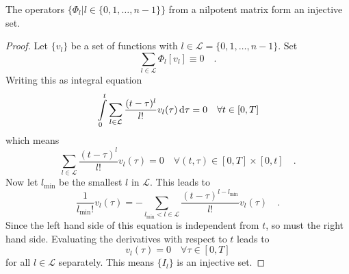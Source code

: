 \begin{proposition}
The operators $\{\Phi_l|l\in\{0,1,\ldots,n-1\}\}$ from a nilpotent matrix form an injective 
set.
\end{proposition}
\begin{proof}
Let $\{v_{l}\}$ be a set of functions with $l\in\mathcal{L}=\{0,1,\ldots,n-1\}$. Set
\begin{equation}
\sum\limits_{l\in\mathcal{L}} \Phi_l[v_l] 
\equiv 0 \quad . 
\end{equation}
Writing this as integral equation
\begin{equation}
\int\limits_0^t \sum\limits_{l\in\mathcal{L}}  
 \frac{(t-\tau)^l}{l!} v_l(\tau) \, \text{d} \tau = 0 \quad \forall t\in[0,T]
\end{equation}
which means
\begin{equation}
 \sum\limits_{l\in\mathcal{L}}  
\frac{(t-\tau)^l}{l!} v_l(\tau) = 0 \quad \forall (t,\tau)
\in [0,T]\times [0,t] \quad .
\end{equation}
Now let $l_\text{min}$ be the smallest $l$ in $\mathcal{L}$. This leads to 
\begin{equation} 
 \frac{1}{l_\text{min}!} v_l(\tau) = - 
\sum\limits_{l_\text{min} <l\in\mathcal{L}}  
\frac{(t-\tau)^{l-l_\text{min}}}{l!}  v_l(\tau) \quad .
\end{equation}
Since the left hand side of this equation is independent from $t$, so must the 
right hand side. Evaluating the derivatives with respect to $t$ leads to 
\begin{equation}
v_l(\tau) = 0 \quad \forall \tau \in [0,T]
\end{equation}
for all $l\in \mathcal{L}$ separately. This means $\{I_l\}$ is an injective 
set.
\end{proof}